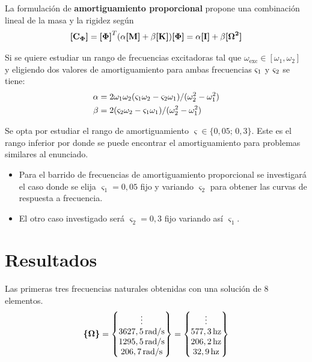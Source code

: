 \documentclass[onecolumn,10pt,titlepage,a4paper]{article}
\begin{document}
La formulación de \textbf{amortiguamiento proporcional} propone una combinación lineal de la masa y la rigidez según
\begin{equation} \label{eq:proporcional}
\Mme{C\modal} = \Mme{\Phib}^T ( \alpha \Mme{M}+\beta \Mme{K})\Mme{\Phib} = \alpha \Mme{I} +\beta \Mme{\Omegab^2}
\end{equation}

Si se quiere estudiar un rango de frecuencias excitadoras tal que $\omega_{\mathrm{exc}}\in [\omega_1, \omega_2]$ y eligiendo dos valores de amortiguamiento para ambas frecuencias $\dampfact_1$ y $\dampfact_2$ se tiene: \cite{cook2007concepts}
\begin{align} \label{eq:alfabeta}
\alpha &= 2\omega_1 \omega_2 (\dampfact_1 \omega_2 -\dampfact_2 \omega_1)/(\omega_2^2 - \omega_1^2) \\ \beta &= 2(\dampfact_2\omega_2 -\dampfact_1 \omega_1)/(\omega_2^2 - \omega_1^2)
\end{align}

Se opta por estudiar el rango de amortiguamiento  $\varsigma\in \{0,05;\, 0,3\}$. Este es el rango inferior por donde se puede encontrar el amortiguamiento para problemas similares al enunciado.
\begin{itemize}
	\item Para el barrido de frecuencias de amortiguamiento proporcional se investigará el caso donde se elija $\varsigma_1=0,05$ fijo y variando $\varsigma_2$ para obtener las curvas de respuesta a frecuencia.
	\item El otro caso investigado será $\varsigma_2=0,3$ fijo variando así $\varsigma_1$.
\end{itemize}

\section{Resultados}
Las primeras tres frecuencias naturales obtenidas con una solución de 8 elementos.
\[
\Cme{\Omega} = \begin{Bmatrix}
\vdots \\
3627,5 \si{\, \radian \per \second}\\
1295,5 \si{\, \radian \per \second}\\
 206,7 \si{\, \radian \per \second}
\end{Bmatrix}=\begin{Bmatrix}
\vdots \\
577,3\, \textrm{hz}\\
206,2\, \textrm{hz}\\
32,9\, \textrm{hz} 
\end{Bmatrix}
\]
\end{document}
